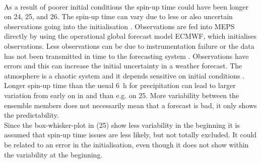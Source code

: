 \\
As a result of poorer initial conditions the spin-up time could have been longer on \num{24}, \num{25}, and \SI{26}{\dec}. The spin-up time can vary due to less or also uncertain observations going into the initialisation \citep{warner_tutorial_1997}. 
Observations are fed into MEPS directly by using the operational global forecast model ECMWF, which initialises observations. Less observations can be  due to instrumentation failure or the data has not been transmitted in time to the forecasting system \citep{kalnay_atmospheric_2003}.
Observations have errors and this can increase the initial uncertainty in a weather forecast. The atmosphere is a chaotic system and it depends sensitive on initial conditions \citep{lorenz_atmospheric_1969}. 
Longer spin-up time than the usual \SI{6}{\hour} for precipitation can lead to larger variation from early on in  and  
than e.g. on \SI{25}{\dec}.
More variability between the ensemble members does not necessarily mean that a forecast is bad, it only shows the predictability. %
\\
Since the box-whisker-plot in  (\SI{25}{\dec}) show less variability in the beginning it is assumed that spin-up time issues are less likely, but not totally excluded. It could be related to an error in the initialisation, even though it does not show within the variability at the beginning.
